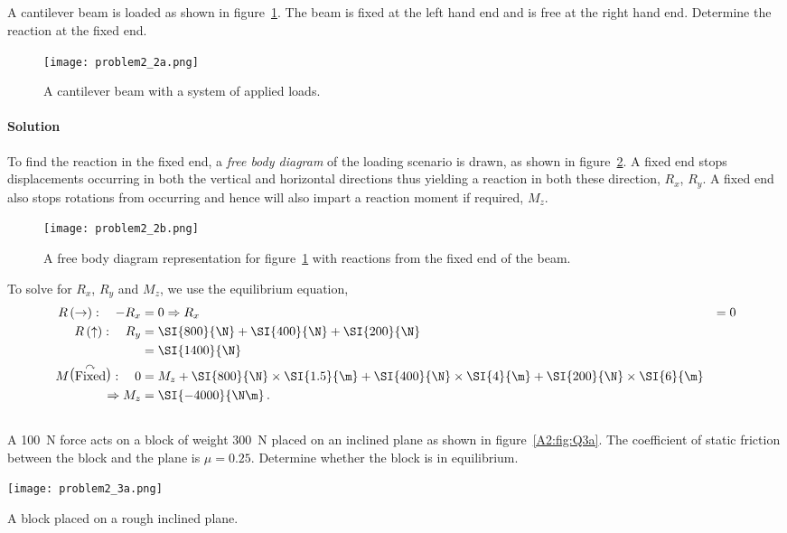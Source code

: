 \documentclass[a4paper,justified,oneside]{tufte-handout}
\numberwithin{equation}{subsection}
\begin{document}
\subsection{}
A cantilever beam is loaded as shown in figure~\ref{A2:fig:Q2a}. The beam is fixed at the left hand end and is free at the right hand end. Determine the reaction at the fixed end.

\begin{figure}
	\centering
	\texttt{[image: problem2\_2a.png]}
	\caption{A cantilever beam with a system of applied loads.}
	\label{A2:fig:Q2a}
\end{figure}

\begin{solution}
\paragraph{Solution}
To find the reaction in the fixed end, a \emph{free body diagram} of the loading scenario is drawn, as shown in figure~\ref{A2:fig:Q2b}. A fixed end stops displacements occurring in both the vertical and horizontal directions thus yielding a reaction in both these direction, $R_x$, $R_y$. A fixed end also stops rotations from occurring and hence will also impart a reaction moment if required, $M_z$. 
\begin{figure}
	\centering
	\texttt{[image: problem2\_2b.png]}
	\caption{A free body diagram representation for figure~\protect\ref{A2:fig:Q2a} with reactions from the fixed end of the beam.}
	\label{A2:fig:Q2b}
\end{figure}

To solve for $R_x$, $R_y$ and $M_z$, we use the equilibrium equation,
\begin{align*}
	R\left(\rightarrow\right):\quad -R_x &= 0
	\Rightarrow R_x					&=	0	\\
	R\left(\uparrow\right):\quad	R_y		&=	\SI{800}{\N}	+\SI{400}{\N}	+\SI{200}{\N}	\\
									&=	\SI{1400}{\N}	\\
	M\raisebox{1.5pt}{\big(}\overset{\curvearrowright}{\text{Fixed}}\raisebox{1.5pt}{\big)}:\quad 0	&=	M_z	+\SI{800}{\N} \times \SI{1.5}{\m}	+\SI{400}{\N} \times \SI{4}{\m}	+\SI{200}{\N} \times \SI{6}{\m}	\\
						\Rightarrow	M_z	&=	\SI{-4000}{\N\m} \,.
\end{align*}
\clearpage
\end{solution}

\subsection{}
A \SI{100}{\N} force acts on a block of weight \SI{300}{\N} placed on an inclined plane as shown in figure~\ref{A2:fig:Q3a}. The coefficient of static friction between the block and the plane is $\mu=0.25$. Determine whether the block is in equilibrium.
\begin{marginfigure}
	\centering
	\texttt{[image: problem2\_3a.png]}
	\caption{A block placed on a rough inclined plane.}
	\label{A2:fig:Q3a}
\end{marginfigure}
\end{document}
